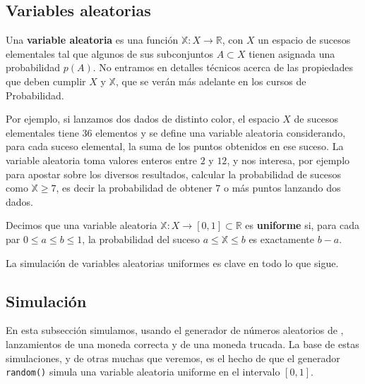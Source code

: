 \subsection{Variables aleatorias}

Una {\bf variable aleatoria} es una funci\'on $\mathbb{X}:X \longrightarrow
\mathbb{R}$, con $X$ un espacio de sucesos elementales tal que algunos de sus
subconjuntos $A\subset X$ tienen asignada una probabilidad $p(A)$. No entramos
en detalles t\'ecnicos acerca de las propiedades que deben cumplir $X$ y
$\mathbb{X}$, que se ver\'an m\'as adelante en los cursos de Probabilidad.

Por ejemplo, si lanzamos dos dados de distinto color, el espacio $X$ de sucesos
elementales tiene $36$ elementos y se define una variable aleatoria
considerando, para cada suceso elemental, la suma de los puntos obtenidos en ese
suceso. La variable aleatoria  toma valores enteros entre $2$ y $12$, y nos
interesa, por ejemplo para apostar sobre los diversos resultados, calcular la
probabilidad de sucesos como $\mathbb{X}\ge 7$, es decir la probabilidad de
obtener $7$ o m\'as puntos lanzando dos dados.

Decimos que una variable aleatoria $\mathbb{X}:X\to [0,1]\subset \mathbb{R}$ es
{\bf uniforme} si, para cada par $0\le a \le b\le 1$,  la probabilidad del
suceso $a\le \mathbb{X}\le b$ es exactamente $b-a$. 

La simulaci\'on de variables aleatorias uniformes es clave en todo lo que sigue.




\subsection{Simulaci\'on}
En esta subsecci\'on simulamos, usando el generador de n\'umeros aleatorios de 
{\sage}, lanzamientos de una moneda correcta y de una moneda trucada.  La base 
de estas simulaciones, y de otras muchas que veremos, es el hecho de que el 
generador \lstinline|random()| simula una variable aleatoria uniforme en el 
intervalo $[0,1].$ 

